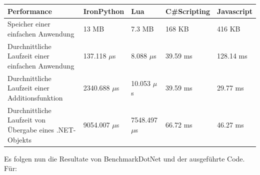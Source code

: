 \begin{table}[H] 
    \begin{tabular}{|p{3cm}|p{3cm}|p{3cm}|p{3cm}|p{3cm}|}
        \hline
        Performance & IronPython & Lua & C\#Scripting & Javascript\\ \hline
        Speicher einer einfachen Anwendung & 13 MB & 7.3 MB & 168 KB & 416 KB  \\ \hline
        Durchnittliche Laufzeit einer einfachen Anwendung & 137.118 $\mu$s & 8.088 $\mu$s & 39.59 ms & 128.14 ms\\ \hline
        Durchnittliche Laufzeit einer Additionsfunktion & 2340.688 $\mu$s & 10.053 $\mu$s &39.59 ms &  29.77 ms \\ \hline
        Durchnittliche Laufzeit von Übergabe eines .NET-Objekts & 9054.007 $\mu$s & 7548.497 $\mu$s &  66.72 ms & 46.27 ms  \\ \hline
    \end{tabular}
\end{table}

\newpage
Es folgen nun die Resultate von BenchmarkDotNet und der ausgeführte Code.\\

Für:

